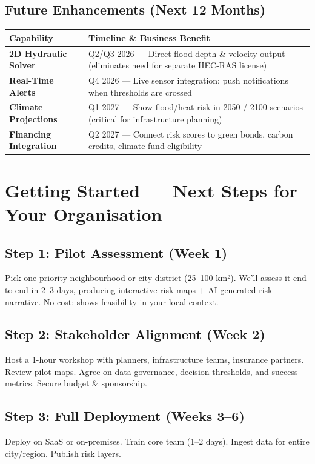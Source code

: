 \documentclass[11pt, a4paper]{article}
\begin{document}
\subsection*{Future Enhancements (Next 12 Months)}

\begin{tabularx}{\linewidth}{>{\bfseries}p{3.8cm} X}
\toprule
\textcolor{primary}{Capability} & \textcolor{primary}{Timeline \& Business Benefit} \\
\midrule
2D Hydraulic Solver   & Q2/Q3 2026 — Direct flood depth \& velocity output (eliminates need for separate HEC-RAS license) \\[4pt]
Real-Time Alerts      & Q4 2026 — Live sensor integration; push notifications when thresholds are crossed \\[4pt]
Climate Projections   & Q1 2027 — Show flood/heat risk in 2050 / 2100 scenarios (critical for infrastructure planning) \\[4pt]
Financing Integration & Q2 2027 — Connect risk scores to green bonds, carbon credits, climate fund eligibility \\
\bottomrule
\end{tabularx}

\section*{Getting Started — Next Steps for Your Organisation}

\subsection*{Step 1: Pilot Assessment (Week 1)}
\noindent
Pick one priority neighbourhood or city district (25–100 km²). We'll assess it end-to-end in 2–3 days, producing interactive
risk maps + AI-generated risk narrative. No cost; shows feasibility in your local context.

\subsection*{Step 2: Stakeholder Alignment (Week 2)}
\noindent
Host a 1-hour workshop with planners, infrastructure teams, insurance partners. Review pilot maps. Agree on data governance,
decision thresholds, and success metrics. Secure budget \& sponsorship.

\subsection*{Step 3: Full Deployment (Weeks 3–6)}
\noindent
Deploy on SaaS or on-premises. Train core team (1–2 days). Ingest data for entire city/region. Publish risk layers.
\end{document}
